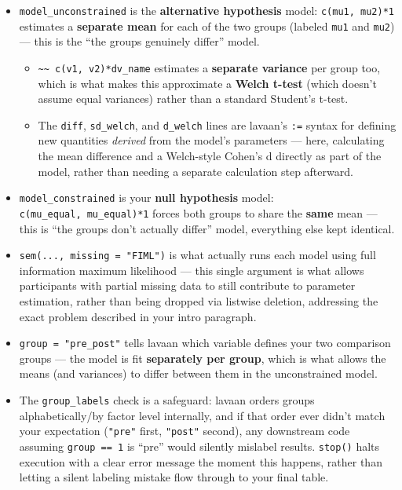 \documentclass[
  letterpaper,
  DIV=11,
  numbers=noendperiod]{scrreprt}
\providecommand{\tightlist}{%
  \setlength{\itemsep}{0pt}\setlength{\parskip}{0pt}}\usepackage{longtable,booktabs,array}
\begin{document}
\begin{itemize}
\item
  \texttt{model\_unconstrained} is the \textbf{alternative hypothesis}
  model: \texttt{c(mu1,\ mu2)*1} estimates a \textbf{separate mean} for
  each of the two groups (labeled \texttt{mu1} and \texttt{mu2}) ---
  this is the ``the groups genuinely differ'' model.

  \begin{itemize}
  \item
    \texttt{\textasciitilde{}\textasciitilde{}\ c(v1,\ v2)*dv\_name}
    estimates a \textbf{separate variance} per group too, which is what
    makes this approximate a \textbf{Welch t-test} (which doesn't assume
    equal variances) rather than a standard Student's t-test.
  \item
    The \texttt{diff}, \texttt{sd\_welch}, and \texttt{d\_welch} lines
    are lavaan's \texttt{:=} syntax for defining new quantities
    \emph{derived} from the model's parameters --- here, calculating the
    mean difference and a Welch-style Cohen's d directly as part of the
    model, rather than needing a separate calculation step afterward.
  \end{itemize}
\end{itemize}

\begin{itemize}
\tightlist
\item
  \texttt{model\_constrained} is your \textbf{null hypothesis} model:
  \texttt{c(mu\_equal,\ mu\_equal)*1} forces both groups to share the
  \textbf{same} mean --- this is ``the groups don't actually differ''
  model, everything else kept identical.
\end{itemize}

\begin{itemize}
\tightlist
\item
  \texttt{sem(...,\ missing\ =\ "FIML")} is what actually runs each
  model using full information maximum likelihood --- this single
  argument is what allows participants with partial missing data to
  still contribute to parameter estimation, rather than being dropped
  via listwise deletion, addressing the exact problem described in your
  intro paragraph.
\end{itemize}

\begin{itemize}
\item
  \texttt{group\ =\ "pre\_post"} tells lavaan which variable defines
  your two comparison groups --- the model is fit \textbf{separately per
  group}, which is what allows the means (and variances) to differ
  between them in the unconstrained model.
\item
  The \texttt{group\_labels} check is a safeguard: lavaan orders groups
  alphabetically/by factor level internally, and if that order ever
  didn't match your expectation (\texttt{"pre"} first, \texttt{"post"}
  second), any downstream code assuming \texttt{group\ ==\ 1} is ``pre''
  would silently mislabel results. \texttt{stop()} halts execution with
  a clear error message the moment this happens, rather than letting a
  silent labeling mistake flow through to your final table.
\end{itemize}
\end{document}
